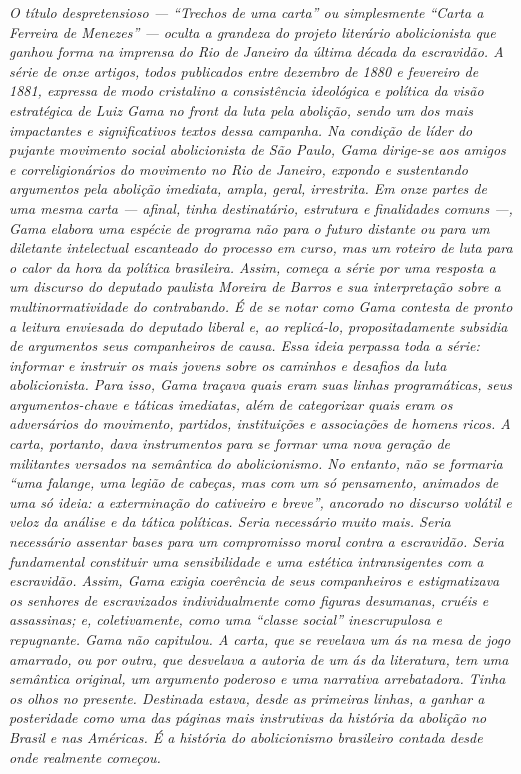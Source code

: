 {\begin{didas}
\emph{O título despretensioso --- ``Trechos de uma carta'' ou
simplesmente ``Carta a Ferreira de Menezes'' --- oculta a grandeza
do projeto literário abolicionista que ganhou forma na imprensa do Rio
de Janeiro da última década da escravidão. A série de onze artigos,
todos publicados entre dezembro de 1880 e fevereiro de 1881, expressa de
modo cristalino a consistência ideológica e política da visão
estratégica de Luiz Gama no front da luta pela abolição, sendo
um dos mais impactantes e significativos textos dessa campanha.
Na condição de líder do pujante movimento social
abolicionista de São Paulo, Gama dirige-se aos amigos e correligionários
do movimento no Rio de Janeiro, expondo e sustentando argumentos pela
abolição imediata, ampla, geral, irrestrita. Em onze partes de uma mesma
carta --- afinal, tinha destinatário, estrutura e finalidades comuns ---,
Gama elabora uma espécie de programa não para o futuro distante ou para
um diletante intelectual escanteado do processo em curso, mas um
roteiro de luta para o calor da hora da política brasileira. Assim,
começa a série por uma resposta a um discurso do deputado paulista
Moreira de Barros e sua interpretação sobre a multinormatividade do
contrabando. É de se notar como Gama contesta de pronto a leitura
enviesada do deputado liberal e, ao
replicá-lo, propositadamente subsidia de argumentos seus companheiros de
causa. Essa ideia perpassa toda a série:
informar e instruir os mais jovens sobre os caminhos e
desafios da luta abolicionista. Para isso, Gama traçava quais eram suas
linhas programáticas, seus argumentos-chave e táticas imediatas, além de
categorizar quais eram os adversários do movimento, partidos,
instituições e associações de homens ricos. A carta, portanto, dava
instrumentos para se formar uma nova geração de militantes versados na
semântica do abolicionismo. No entanto, não se formaria ``uma falange,
uma legião de cabeças, mas com um só pensamento, animados de uma só
ideia: a exterminação do cativeiro e breve'', ancorado no discurso
volátil e veloz da análise e da tática políticas. Seria necessário muito
mais. Seria necessário assentar bases para um compromisso moral contra a
escravidão. Seria fundamental constituir uma sensibilidade e uma
estética intransigentes com a escravidão. Assim, Gama exigia coerência
de seus companheiros e
estigmatizava os senhores de escravizados individualmente como figuras
desumanas, cruéis e assassinas; e, coletivamente, como uma ``classe
social'' inescrupulosa e repugnante. Gama não capitulou. A carta, que se
revelava um ás na mesa de jogo amarrado, ou por outra, que desvelava a
autoria de um ás da literatura, tem uma semântica original, um argumento
poderoso e uma narrativa arrebatadora. Tinha os olhos no presente.
Destinada estava, desde as primeiras linhas, a ganhar a posteridade como
uma das páginas mais instrutivas da história da abolição no Brasil e nas
Américas. É a história do abolicionismo brasileiro contada desde onde
realmente começou. }
\end{didas}

}
